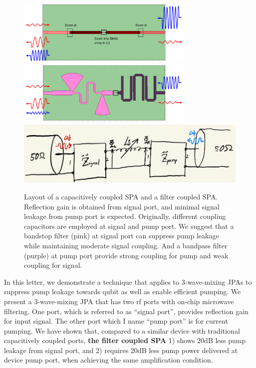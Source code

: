 \documentclass[aip,reprint]{revtex4-2}
\begin{document}
\begin{figure}[htb]
{\label{fig:device1}
\includegraphics[width=8.5cm]{figures/SPA.PNG}
}
{\label{fig:device2}
\includegraphics[width=8.5cm]{figures/FSPA.PNG}
}
{\includegraphics[width=15cm]{figures/circuit_1}
\label{fig:circuit_1} 
}
\caption
{\label{fig:device} Layout of a capacitively coupled SPA and a filter coupled SPA. Reflection gain is obtained from signal port, and minimal signal leakage from pump port is expected. Originally, different coupling capacitors are employed at signal and pump port. We suggest that a bandstop filter (pink) at signal port can suppress pump leakage while maintaining moderate signal coupling. And a bandpass filter (purple) at pump port provide strong coupling for pump and weak coupling for signal. }
\end{figure}


In this letter, we demonstrate a technique that applies to 3-wave-mixing JPAs to suppress pump leakage towards qubit as well as enable efficient pumping. We present a 3-wave-mixing JPA that has two rf ports with on-chip microwave filtering. One port, which is referred to as “signal port”, provides reflection gain for input signal. The other port which I name “pump port” is for current pumping. We have shown that, compared to a similar device with traditional capacitively coupled ports\cite{SPA,Kerr_free}, \textbf{the filter coupled SPA} 1) shows 20dB less pump leakage from signal port, and 2) requires 20dB less pump power delivered at device pump port, when achieving the same amplification condition. 
\end{document}
